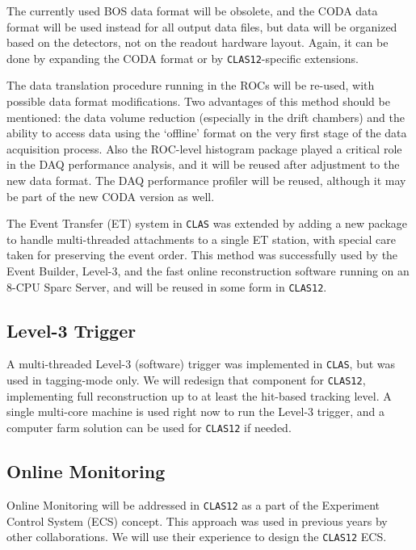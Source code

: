 The currently used BOS data format will be obsolete, and the CODA data format 
will be used instead for all output data files, but data will be organized 
based on the detectors, not on the readout hardware layout.  Again, it can 
be done by expanding the CODA format or by {\tt CLAS12}-specific extensions.

The data translation procedure running in the ROCs will be re-used, with 
possible data format modifications.  Two advantages of this method should 
be mentioned: the data volume reduction (especially in the drift chambers) 
and the ability to access data using the `offline' format on the very first 
stage of the data acquisition process.  Also the ROC-level histogram package 
played a critical role in the DAQ performance analysis, and it will be reused 
after adjustment to the new data format.  The DAQ performance profiler will 
be reused, although it may be part of the new CODA version as well.

The Event Transfer (ET) system in {\tt CLAS} was extended by adding a new 
package to handle multi-threaded attachments to a single ET station, with 
special care taken for preserving the event order.  This method was 
successfully used by the Event Builder, Level-3, and the fast online 
reconstruction software running on an 8-CPU Sparc Server, and will be 
reused in some form in {\tt CLAS12}.

\subsection{Level-3 Trigger}
\label{daq_l3t}

A multi-threaded Level-3 (software) trigger was implemented in {\tt CLAS}, 
but was used in tagging-mode only. We will redesign that component for 
{\tt CLAS12}, implementing full reconstruction up to at least the hit-based 
tracking level.  A single multi-core machine is used right now to run the
Level-3 trigger, and a computer farm solution can be used for {\tt CLAS12} 
if needed.

\subsection{Online Monitoring}

Online Monitoring will be addressed in {\tt CLAS12} as a part of the
Experiment Control System (ECS) concept.  This approach was used in 
previous years by other collaborations.  We will use their experience to 
design the {\tt CLAS12} ECS.

